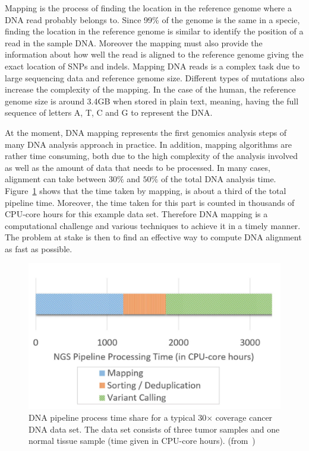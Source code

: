 Mapping is the process of finding the location in the reference genome where a DNA read probably belongs to. Since 99\% of the genome is the same in a specie, finding the location in the reference genome is similar to identify the position of a read in the sample DNA. Moreover the mapping must also provide the information about how well the read is aligned to the reference genome giving the exact location of SNPs and indels.  Mapping DNA reads is a complex task due to large sequencing data and reference genome size. Different types of mutations also increase the complexity of the mapping. In the case of the human, the reference genome size is around 3.4GB when stored in plain text, meaning, having the full sequence of letters A, T, C and G to represent the DNA. 


At the moment, DNA mapping represents the first genomics analysis steps of many DNA analysis approach in practice. In addition, mapping algorithms are rather time consuming, both due to the high complexity of the analysis involved as well as the amount of data that needs to be processed. In many cases, alignment can take between $30\%$ and $50\%$ of the total DNA analysis time.  Figure~\ref{fig:pipelineprocesstime} shows that the time taken by mapping, is about a third of the total pipeline time. Moreover, the time taken for this part is counted in thousands of CPU-core hours for this example data set. Therefore DNA mapping is a computational challenge and various  techniques to achieve it in a timely manner. The problem at stake is then to find an effective way to compute DNA alignment as fast as possible.

\begin{figure}[h]
	\centering
	\includegraphics[width=1\linewidth]{pipelineprocesstime}
	\caption{DNA pipeline process time share for a typical 30$\times$ coverage cancer DNA data set. The data set consists of three tumor samples and one normal tissue sample (time given in CPU-core hours). (from~\cite{HOUTGAST201854})}
	\label{fig:pipelineprocesstime}
\end{figure}


